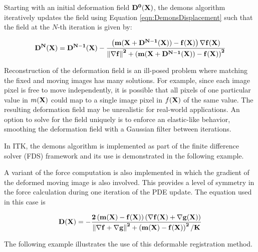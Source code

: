 Starting with an initial deformation field $\bf{D}^{0}(\bf{X})$, the demons
algorithm iteratively updates the field using Equation
\ref{eqn:DemonsDisplacement} such that the field at the $N$-th iteration is
given by:

\begin{equation}
\bf{D}^{N}(\bf{X}) = \bf{D}^{N-1}(\bf{X}) - \frac
{\left(  m(\bf{X}+ \bf{D}^{N-1}(\bf{X})) 
- f(\bf{X}) \right) \nabla f(\bf{X})}
{\left\|  \nabla f \right\|^2 + \left(  
m(\bf{X}+ \bf{D}^{N-1}(\bf{X}) )
 - f(\bf{X}) \right)^2 } 
\label{eqn:DemonsUpdateEquation}
\end{equation}

Reconstruction of the deformation field is an ill-posed problem where
matching the fixed and moving images has many solutions. For example, since
each image pixel is free to move independently, it is possible that all
pixels of one particular value in $m(\bf{X})$ could map to a single image
pixel in $f(\bf{X})$ of the same value. The resulting deformation field may
be unrealistic for real-world applications. An option to solve for the field
uniquely is to enforce an elastic-like behavior, smoothing the deformation
field with a Gaussian filter between iterations.

In ITK, the demons algorithm is implemented as part of the finite difference
solver (FDS) framework and its use is demonstrated in the following example.

 

A variant of the force computation is also implemented in which the gradient of
the deformed moving image is also involved. This provides a level of symmetry
in the force calculation during one iteration of the PDE update. The equation
used in this case is

\begin{equation}
\bf{D}(\bf{X}) = - \frac
{2 \left(  m(\bf{X}) - f(\bf{X}) \right) \left(  \nabla f(\bf{X}) +  \nabla g(\bf{X}) \right) }
{\left\|  \nabla f + \nabla g \right\|^2 + \left(  m(\bf{X}) - f(\bf{X}) \right)^2 / K } 
\label{eqn:DemonsDisplacement2}
\end{equation}

The following example illustrates the use of this deformable registration
method.

 



